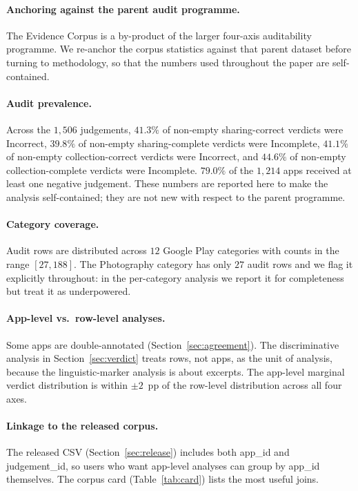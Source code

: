\documentclass[11pt,a4paper]{article}
\newcommand{\dec}[1]{\textsf{#1}}
\begin{document}
\paragraph{Anchoring against the parent audit programme.}
The Evidence Corpus is a by-product of the larger four-axis
auditability programme. We re-anchor the corpus statistics against
that parent dataset before turning to methodology, so that the
numbers used throughout the paper are self-contained.

\paragraph{Audit prevalence.}
Across the $1{,}506$ judgements, $41.3\%$ of non-empty sharing-correct
verdicts were Incorrect, $39.8\%$ of non-empty sharing-complete
verdicts were Incomplete, $41.1\%$ of non-empty collection-correct
verdicts were Incorrect, and $44.6\%$ of non-empty collection-complete
verdicts were Incomplete. $79.0\%$ of the $1{,}214$ apps received at
least one negative judgement. These numbers are reported here to
make the analysis self-contained; they are not new with respect to the
parent programme.

\paragraph{Category coverage.}
Audit rows are distributed across $12$ Google Play categories with
counts in the range $[27, 188]$. The Photography category has only
$27$ audit rows and we flag it explicitly throughout: in the
per-category analysis we report it for completeness but treat it as
underpowered.

\paragraph{App-level vs.\ row-level analyses.}
Some apps are double-annotated (Section~\ref{sec:agreement}). The
discriminative analysis in Section~\ref{sec:verdict} treats rows, not
apps, as the unit of analysis, because the linguistic-marker analysis
is about excerpts. The app-level marginal verdict distribution is
within $\pm2$~pp of the row-level distribution across all four axes.

\paragraph{Linkage to the released corpus.}
The released CSV (Section~\ref{sec:release}) includes both
\dec{app\_id} and \dec{judgement\_id}, so users who want app-level
analyses can group by \dec{app\_id} themselves. The corpus card
(Table~\ref{tab:card}) lists the most useful joins.
\end{document}
